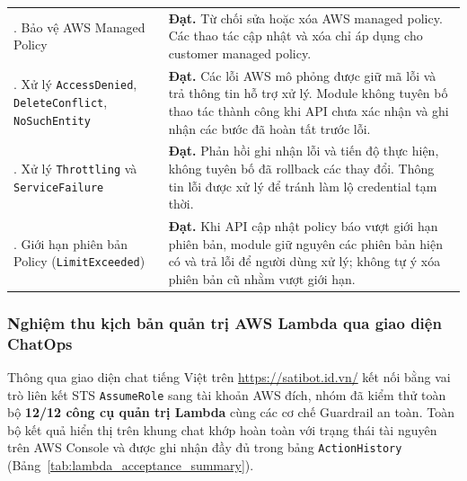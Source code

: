 \documentclass[a4paper,12pt]{article}
\newcommand{\code}[1]{\texttt{#1}}
\begin{document}
\begin{longtable}{@{}
  >{\raggedright\arraybackslash}p{4.8cm}
  >{\raggedright\arraybackslash}p{\dimexpr\linewidth-4.8cm-2\tabcolsep\relax}@{}}
7. Bảo vệ AWS Managed Policy &
\textbf{Đạt.} Từ chối sửa hoặc xóa AWS managed policy.
Các thao tác cập nhật và xóa chỉ áp dụng cho customer managed policy.\\

8. Xử lý \code{AccessDenied}, \code{DeleteConflict},
\code{NoSuchEntity} &
\textbf{Đạt.} Các lỗi AWS mô phỏng được giữ mã lỗi và trả thông tin
hỗ trợ xử lý. Module không tuyên bố thao tác thành công khi API
chưa xác nhận và ghi nhận các bước đã hoàn tất trước lỗi.\\

9. Xử lý \code{Throttling} và \code{ServiceFailure} &
\textbf{Đạt.} Phản hồi ghi nhận lỗi và tiến độ thực hiện,
không tuyên bố đã rollback các thay đổi.
Thông tin lỗi được xử lý để tránh làm lộ credential tạm thời.\\

10. Giới hạn phiên bản Policy
(\code{LimitExceeded}) &
\textbf{Đạt.} Khi API cập nhật policy báo vượt giới hạn phiên bản,
module giữ nguyên các phiên bản hiện có và trả lỗi để người dùng
xử lý; không tự ý xóa phiên bản cũ nhằm vượt giới hạn.\\

\end{longtable}
\endgroup

\subsubsection{Nghiệm thu kịch bản quản trị AWS Lambda qua giao diện ChatOps}

Thông qua giao diện chat tiếng Việt trên \url{https://satibot.id.vn/} kết nối bằng vai trò liên kết STS \code{AssumeRole} sang tài khoản AWS đích, nhóm đã kiểm thử toàn bộ \textbf{12/12 công cụ quản trị Lambda} cùng các cơ chế Guardrail an toàn. Toàn bộ kết quả hiển thị trên khung chat khớp hoàn toàn với trạng thái tài nguyên trên AWS Console và được ghi nhận đầy đủ trong bảng \code{ActionHistory} (Bảng~\ref{tab:lambda_acceptance_summary}).
\end{document}
